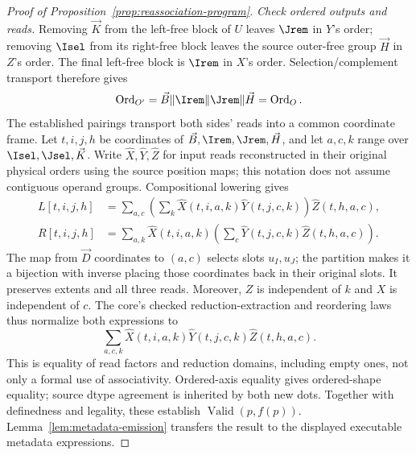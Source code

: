 \begin{proof}[Proof of Proposition~\ref{prop:reassociation-program}]
\emph{Check ordered outputs and reads.}
Removing $\vec K$ from the left-free block of $U$ leaves $\Jrem$ in $Y$'s
order; removing $\Isel$ from its right-free block leaves the source
outer-free group $\vec H$ in $Z$'s order. The final left-free block is $\Irem$
in $X$'s order. Selection/complement transport therefore gives
\begin{equation}
 \operatorname{Ord}_{O'}=\vec B\Vert\Irem\Vert\Jrem\Vert \vec H=\operatorname{Ord}_O.
 \label{eq:reassociation-output-proof}
\end{equation}
The established pairings transport both sides' reads into a common
coordinate frame. Let $t,i,j,h$ be coordinates of
$\vec B,\Irem,\Jrem,\vec H$, and let $a,c,k$ range over
$\Isel,\Jsel,\vec K$. Write $\widehat X,\widehat Y,\widehat Z$ for input
reads reconstructed in their original physical orders using the source
position maps; this notation does not assume contiguous operand groups.
Compositional lowering gives
\begin{equation}
\begin{aligned}
 L[t,i,j,h]
 &=\sum_{a,c}\left(\sum_k
       \widehat X(t,i,a,k)\widehat Y(t,j,c,k)\right)
       \widehat Z(t,h,a,c),\\
 R[t,i,j,h]
 &=\sum_{a,k}\widehat X(t,i,a,k)
       \left(\sum_c\widehat Y(t,j,c,k)\widehat Z(t,h,a,c)\right).
\end{aligned}
\label{eq:reassociation-lowered}
\end{equation}
The map from $\vec D$ coordinates to $(a,c)$ selects slots $u_I,u_J$;
the partition makes it a bijection with inverse placing those coordinates
back in their original slots. It preserves extents and all three reads.
Moreover, $Z$ is independent of $k$ and $X$ is independent of $c$.
The core's checked reduction-extraction and reordering laws thus normalize
both expressions to
\begin{equation}
 \sum_{a,c,k}\widehat X(t,i,a,k)
                 \widehat Y(t,j,c,k)\widehat Z(t,h,a,c).
 \label{eq:reassociation-common-normal-form}
\end{equation}
This is equality of read factors and reduction domains, including empty
ones, not only a formal use of associativity. Ordered-axis equality gives
ordered-shape equality; source dtype agreement is inherited by both new
dots. Together with definedness and legality, these establish
$\operatorname{Valid}(p,f(p))$. Lemma~\ref{lem:metadata-emission} transfers
the result to the displayed executable metadata expressions.
\end{proof}
